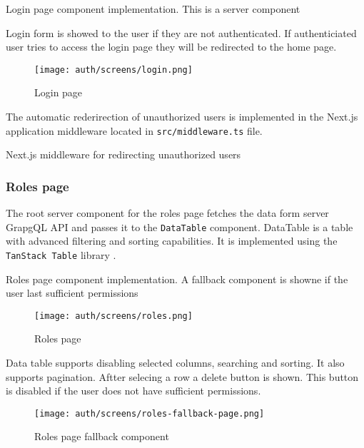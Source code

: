 \documentclass[../main.tex]{subfiles}
\begin{document}
\begin{listing}[H]
  \caption{Login page component implementation. This is a server component}
\end{listing}

Login form is showed to the user if they are not authenticated.
If authenticiated user tries to access the login page they will be redirected to the home page.

\begin{figure}[H]
  \centering
  \texttt{[image: auth/screens/login.png]}
  \caption{Login page}
\end{figure}

The automatic rederirection of unauthorized users is implemented in the Next.js application middleware located in \texttt{src/middleware.ts} file.

\begin{listing}[H]
  \caption{Next.js middleware for redirecting unauthorized users}
\end{listing}

\subsubsection{Roles page}

The root server component for the roles page fetches the data form server GrapgQL API and passes it to the \texttt{DataTable} component.
DataTable is a table with advanced filtering and sorting capabilities. It is implemented using the \texttt{TanStack Table} library \cite{tanstack-table}.

\begin{listing}[H]
  \caption{Roles page component implementation. A fallback component is showne if the user last sufficient permissions}
\end{listing}

\begin{figure}[H]
  \centering
  \texttt{[image: auth/screens/roles.png]}
  \caption{Roles page}
\end{figure}

Data table supports disabling selected columns, searching and sorting. It also supports pagination.
Aftter selecing a row a delete button is shown. This button is disabled if the user does not have sufficient permissions.

\begin{figure}[H]
  \centering
  \texttt{[image: auth/screens/roles-fallback-page.png]}
  \caption{Roles page fallback component}
\end{figure}
\end{document}
